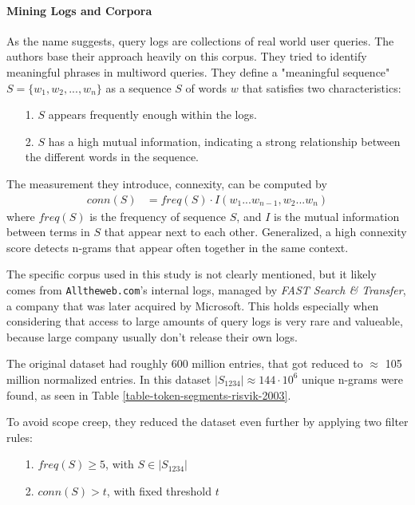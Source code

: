 \paragraph*{Mining Logs and Corpora}
As the name suggests, query logs are collections of real world user queries. The authors base their approach heavily on this corpus. They tried to identify meaningful phrases in multiword queries.
They define a "meaningful sequence" $S = \{w_1,w_2,...,w_n\}$ as a sequence  $S$ of words $w$ that satisfies two characteristics:
\begin{enumerate}
\item[1.] $S$ appears frequently enough within the logs.
\item[2.] $S$ has a high mutual information, indicating a strong relationship between the different words in the sequence.
\end{enumerate}

The measurement they introduce, connexity, can be computed by
\begin{align*}
conn(S) &= freq(S) \cdot I(w_1...w_{n-1},w_2...w_n)
\end{align*}
where $freq(S)$ is the frequency of sequence $S$, and $I$ is the mutual information between terms in $S$ that appear next to each other.
Generalized, a high connexity score detects n-grams that appear often together in the same context.

The specific corpus used in this study is not clearly mentioned, but it likely comes from \texttt{Alltheweb.com}'s internal logs, managed by \textit{FAST Search \& Transfer}, a company that was later acquired by Microsoft. This holds especially when considering that access to large amounts of query logs is very rare and valueable, because large company usually don't release their own logs.



The original dataset had roughly 600 million entries, that got reduced to $\approx$ 105 million normalized entries. In this dataset $|S_{1234}| \approx 144 \cdot 10^6$ unique n-grams were found, as seen in Table \ref{table-token-segments-risvik-2003}.


To avoid scope creep, they reduced the dataset even further by applying two filter rules:
\begin{enumerate}
\item[1.] $freq(S) \ge 5$, with $S \in |S_{1234}|$
\item[2.] $conn(S) > t$, with fixed threshold $t$
\end{enumerate}

